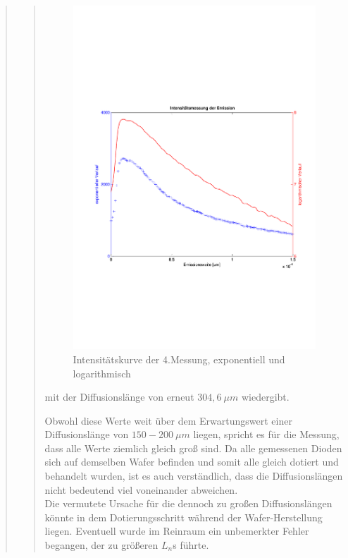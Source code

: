 \begin{quote}
\begin{quote}
        \begin{figure}[H]
                    \centering
                        \includegraphics[scale=0.53, trim = 1cm 6cm 1.5cm 8cm,
                        clip]{./Emissionsbilder/vier/Intensitatsmessung.pdf}
                        \caption{Intensitätskurve der 4.Messung, exponentiell
                        und logarithmisch}
                            \label{fig:./Emissionsbilder/vier/Intensitatsmessung.pdf}
        \end{figure}

        mit der Diffusionslänge von erneut $304,6\ \mu m$ wiedergibt.

        \vspace{1.5em}

        Obwohl diese Werte weit über dem Erwartungswert einer Diffusionslänge
        von $150 - 200\ \mu m$ liegen, spricht es für die Messung, dass alle
        Werte ziemlich gleich groß sind. Da alle gemessenen Dioden sich auf
        demselben Wafer befinden und somit alle gleich dotiert und behandelt wurden, ist
        es auch verständlich, dass die Diffusionslängen nicht bedeutend viel
        voneinander abweichen.\\
        Die vermutete Ursache für die dennoch zu großen Diffusionslängen könnte
        in dem Dotierungsschritt während der Wafer-Herstellung liegen. Eventuell
        wurde im Reinraum ein unbemerkter Fehler begangen, der zu größeren
        $L_n$s führte.


\end{quote}
\end{quote}
